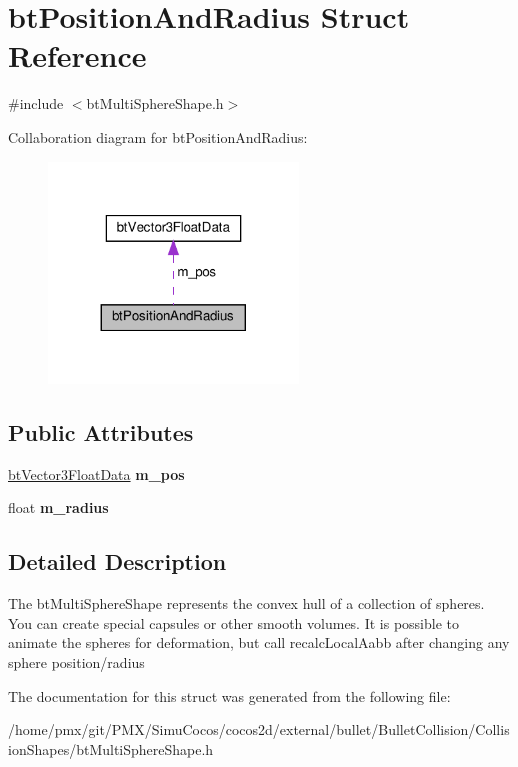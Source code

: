 \hypertarget{structbtPositionAndRadius}{}\section{bt\+Position\+And\+Radius Struct Reference}
\label{structbtPositionAndRadius}


{\ttfamily \#include $<$bt\+Multi\+Sphere\+Shape.\+h$>$}



Collaboration diagram for bt\+Position\+And\+Radius\+:
\nopagebreak
\begin{figure}[H]
\begin{center}
\leavevmode
\includegraphics[width=188pt]{structbtPositionAndRadius__coll__graph}
\end{center}
\end{figure}
\subsection*{Public Attributes}
\begin{DoxyCompactItemize}
\item 
\mbox{\label{structbtPositionAndRadius_ad3c3f39664da90d0d54f632f584f14dc}} 
\hyperlink{structbtVector3FloatData}{bt\+Vector3\+Float\+Data} {\bfseries m\+\_\+pos}
\item 
\mbox{\label{structbtPositionAndRadius_aaf6d3dc5f4db916e0f91026dcc57be26}} 
float {\bfseries m\+\_\+radius}
\end{DoxyCompactItemize}


\subsection{Detailed Description}
The bt\+Multi\+Sphere\+Shape represents the convex hull of a collection of spheres. You can create special capsules or other smooth volumes. It is possible to animate the spheres for deformation, but call \textquotesingle{}recalc\+Local\+Aabb\textquotesingle{} after changing any sphere position/radius 

The documentation for this struct was generated from the following file\+:\begin{DoxyCompactItemize}
\item 
/home/pmx/git/\+P\+M\+X/\+Simu\+Cocos/cocos2d/external/bullet/\+Bullet\+Collision/\+Collision\+Shapes/bt\+Multi\+Sphere\+Shape.\+h\end{DoxyCompactItemize}
